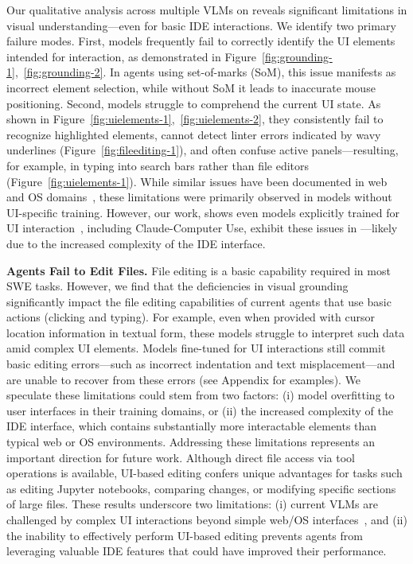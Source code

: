 Our qualitative analysis across multiple VLMs on \bench{} reveals significant limitations in visual understanding—even for basic IDE interactions.
We identify two primary failure modes.
First, models frequently fail to correctly identify the UI elements intended for interaction, as demonstrated in Figure~\ref{fig:grounding-1},~\ref{fig:grounding-2}.
In agents using set-of-marks (SoM), this issue manifests as incorrect element selection, while without SoM it leads to inaccurate mouse positioning.
Second, models struggle to comprehend the current UI state.
As shown in Figure~\ref{fig:uielements-1},~\ref{fig:uielements-2}, they consistently fail to recognize highlighted elements, cannot detect linter errors indicated by wavy underlines (Figure~\ref{fig:fileediting-1}), and often confuse active panels—resulting, for example, in typing into search bars rather than file editors (Figure~\ref{fig:uielements-1}).
While similar issues have been documented in web and OS domains~\cite{koh2024visualwebarenaevaluatingmultimodalagents, xie2024osworldbenchmarkingmultimodalagents}, these limitations were primarily observed in models without UI-specific training. However, our work, shows even models explicitly trained for UI interaction~\cite{anthropic2024developing}, including Claude-Computer Use, exhibit these issues in \ours{}—likely due to the increased complexity of the IDE interface.

\textbf{Agents Fail to Edit Files.}
File editing is a basic capability required in most SWE tasks.
However, we find that the deficiencies in visual grounding significantly impact the file editing capabilities of current agents that use basic actions (clicking and typing).
For example, even when provided with cursor location information in textual form, these models struggle to interpret such data amid complex UI elements.
Models fine-tuned for UI interactions still commit basic editing errors—such as incorrect indentation and text misplacement—and are unable to recover from these errors (see Appendix for examples). 
We speculate these limitations could stem from two factors: (i) model overfitting to user interfaces in their training domains, or (ii) the increased complexity of the \ours{} IDE interface, which contains substantially more interactable elements than typical web or OS environments. Addressing these limitations represents an important direction for future work.
Although direct file access via tool operations is available, UI-based editing confers unique advantages for tasks such as editing Jupyter notebooks, comparing changes, or modifying specific sections of large files.
These results underscore two limitations: (i) current VLMs are challenged by complex UI interactions beyond simple web/OS interfaces~\cite{xie2024osworldbenchmarkingmultimodalagents,koh2024visualwebarenaevaluatingmultimodalagents}, and (ii) the inability to effectively perform UI-based editing prevents agents from leveraging valuable IDE features that could have improved their performance.

